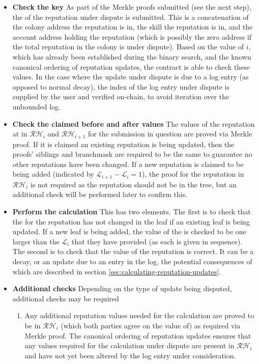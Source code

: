 \begin{itemize}
\item \textbf{Check the key} As part of the Merkle proofs submitted (see the next step), the  of the reputation under dispute is submitted. This is a concatenation of the colony address the reputation is in, the skill the reputation is in, and the account address holding the reputation (which is possibly the zero address if the total reputation in the colony is under dispute). Based on the value of $i$, which has already been established during the binary search, and the known canonical ordering of reputation updates, the contract is able to check these values. In the case where the update under dispute is due to a log entry (as opposed to normal decay), the index of the log entry under dispute is supplied by the user and verified on-chain, to avoid iteration over the unbounded log.
\item \textbf{Check the claimed before and after values} The values of the reputation at  in $\mathcal{RH}_{i}$ and $\mathcal{RH}_{i+1}$ for the submission in question are proved via Merkle proof. If it is claimed an existing reputation is being updated, then the proofs' siblings and branchmask are required to be the same to guarantee no other reputations have been changed. If a new reputation is claimed to be being added (indicated by $\mathcal{L}_{i+1} - \mathcal{L}_i = 1$), the proof for the reputation in $\mathcal{RH}_i$ is not required as the reputation should not be in the tree, but an additional check will be performed later to confirm this.
\item \textbf{Perform the calculation} This has two elements. The first is to check that the  for the reputation has not changed in the leaf if an existing leaf is being updated. If a new leaf is being added, the value of the  is checked to be one larger than the $\mathcal{L}_{i}$ that they have provided (as each  is given in sequence). The second is to check that the value of the reputation is correct. It can be a decay, or an update due to an entry in the log, the potential consequences of which are described in section \ref{sec:calculating-reputation-updates}.
\item \textbf{Additional checks} Depending on the type of update being disputed, additional checks may be required
\begin{enumerate} \item Any additional reputation values needed for the calculation are proved to be in $\mathcal{RH}_{i}$ (which both parties agree on the value of) as required via Merkle proof. The canonical ordering of reputation updates ensures that any values required for the calculation under dispute are present in $\mathcal{RH}_{i}$ and have not yet been altered by the log entry under consideration.

\end{enumerate}
\end{itemize}
